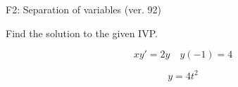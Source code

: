 \begin{exercise}
  \begin{exerciseTitle}F2: Separation of variables (ver. 92)\end{exerciseTitle}
  \begin{exerciseStatement}
    
Find the solution to the given IVP.

    
\[xy'= 2 y \hspace{1em} y( -1 ) = 4\]

  \end{exerciseStatement}
  \begin{exerciseAnswer}
    
\[y= 4 t^ 2\]

  \end{exerciseAnswer}
\end{exercise}